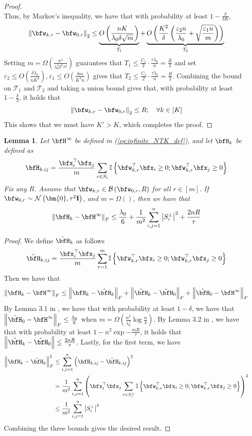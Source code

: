 \documentclass[10pt]{article} %
\newtheorem{lemma}[theorem]{Lemma}
\theoremstyle{definition}
\theoremstyle{plain}
\newcommand{\paren}[1]{\left(#1\right)}
\newcommand{\norm}[1]{\left\|#1\right\|}
\newcommand{\indy}[1]{\mathbb{I}\left\{#1\right\}}
\def\bfI{{\mathbf{I}}}\def\bfJ{{\mathbf{J}}}\def\bfK{{\mathbf{K}}}\def\bfL{{\mathbf{L}}}
\begin{document}
\begin{proof}
\[    \]
    Thus, by Markov's inequality, we have that with probability at least $1 - \frac{\delta}{3K}$,
    \[
        \norm{\bfw_{k,r} - \bfw_{0,r}}_2 \leq \underbrace{O\paren{\frac{nK}{\lambda_0\delta\sqrt{m}}}}_{\mathcal{T}_1} + \underbrace{O\paren{\frac{K^2}{\delta}\paren{\frac{\varepsilon_2n}{\lambda_0} + \sqrt{\frac{\varepsilon_1n}{m}}}}}_{\mathcal{T}_2}
    \]
    Setting $m = \Omega\paren{\frac{n^4}{\lambda_0^4\delta^2\tau^2}}$ guarantees that $T_1 \leq \frac{C_1}{2}\cdot\frac{\tau \lambda_0}{n} = \frac{R}{2}$ and set $\varepsilon_2 \leq O\paren{\frac{\delta\lambda_0}{nK^2}}, \varepsilon_1\leq O\paren{\frac{\delta m}{K^4n}}$ gives that $T_2\leq \frac{C_1}{2}\cdot\frac{\tau \lambda_0}{n} = \frac{R}{2}$. Combining the bound on $\mathcal{T}_1$ and $\mathcal{T}_2$ and taking a union bound gives that, with probability at least $1-\frac{\delta}{3}$, it holds that
    \[
        \norm{\bfw_{k,r} - \bfw_{0,r}}_2 \leq R;\quad \forall k\in[K]
    \]
    This shows that we must have $K' > K$, which completes the proof.
\end{proof}
\begin{lemma}
    \label{lem:kernel_diff}
    Let $\bfH^\infty$ be defined in (\ref{eq:infinite_NTK_def}), and let $\bfH_k$ be defined as
    \[
        \bfH_{k,ij} = \frac{\bfx_i^\top\bfx_j}{m}\sum_{r\in S_i}\indy{\bfw_{k,r}^\top\bfx_i\geq 0;\bfw_{k,r}^\top\bfx_j\geq 0}
    \]
    Fix any $R$. Assume that $\bfw_{k,r}\in\mathcal{B}\paren{\bfw_{0,r}, R}$ for all $r\in[m]$. If $\bfw_{0,r}\sim\mathcal{N}\paren{\bm{0},\tau^2\bfI}$, and $m = \Omega\paren{}$, then we have that 
    \[
        \norm{\bfH_k - \bfH^\infty}_F \leq \frac{\lambda_0}{6} + \frac{1}{m^2}\sum_{i,j=1}^n\left|S_i^\perp\right|^2 + \frac{2nR}{\tau}
    \]
\end{lemma}
\begin{proof}
    We define $\hat{\bfH}_k$ as follows
    \[
        \hat{\bfH}_{k,ij} = \frac{\bfx_i^\top\bfx_j}{m}\sum_{r=1}^m\indy{\bfw_{k,r}^\top\bfx_i\geq 0;\bfw_{k,r}^\top\bfx_j\geq 0}
    \]
    Then we have that 
    \[
        \norm{\bfH_k - \bfH^\infty}_F\leq \norm{\bfH_k - \hat{\bfH}_k}_F + \norm{\hat{\bfH}_k - \hat{\bfH}_0}_F + \norm{\hat{\bfH}_0 - \bfH^\infty}_F
    \]
    By Lemma 3.1 in \cite{du2018gradient}, we have that with probability at least $1-\delta$, we have that $\norm{\hat{\bfH}_0 - \bfH^\infty}_F\leq \frac{\lambda_0}{6}$ when $m = \Omega\paren{\frac{n^2}{\lambda_0^2}\log\frac{n}{\delta}}$. By Lemma 3.2 in \cite{song2020quadraticsufficesoverparametrizationmatrix}, we have that with probability at least $1 - n^2\exp{-\frac{mR}{\tau}}$, it holds that $\norm{\hat{\bfH}_k -\hat{\bfH}_0} \leq \frac{2nR}{\tau}$. Lastly, for the first term, we have
    \begin{align*}
        \norm{\bfH_k - \hat{\bfH}_k}_F^2 & \leq \sum_{i,j=1}^n\paren{\bfH_{k,ij} - \hat{\bfH}_{k,ij}}^2\\
        & = \frac{1}{m^2}\sum_{i,j=1}^n\paren{\bfx_i^\top\bfx_j\sum_{r\in S_i^\perp}\indy{\bfw_{k,r}^\top\bfx_i\geq 0;\bfw_{k,r}^\top\bfx_j\geq 0}}^2\\
        & \leq \frac{1}{m^2}\sum_{i,j=1}^n\left|S_i^\perp\right|^2
    \end{align*}
    Combining the three bounds gives the desired result.
\end{proof}
\end{document}
